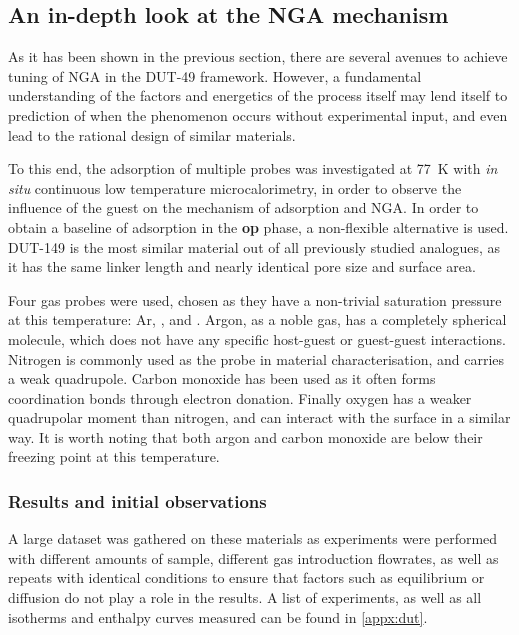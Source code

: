 
\subsection{An in-depth look at the NGA mechanism}%
\label{dut:indepth}

As it has been shown in the previous section, there are 
several avenues to achieve tuning of NGA in the DUT-49 framework.
However, a fundamental understanding of the factors and 
energetics of the process itself may
lend itself to prediction of when the phenomenon occurs without 
experimental input, and even lead to the rational design of 
similar materials.

To this end, the adsorption of multiple probes was investigated 
at \SI{77}{\kelvin} with \textit{in situ} continuous low 
temperature microcalorimetry,
in order to observe the influence of the guest on the mechanism of
adsorption and NGA. In order to obtain a baseline of adsorption in 
the \textbf{op} phase, a non-flexible alternative is used. 
DUT-149 is the most similar material out of all previously studied
analogues, as it has the same linker length and nearly identical pore
size and surface area. 

Four gas probes were used, chosen as they 
have a non-trivial saturation pressure at this temperature: Ar,
,  and . Argon, as a 
noble gas, has a completely spherical molecule, which does not 
have any specific host-guest or guest-guest interactions. Nitrogen
is commonly used as the probe in material characterisation, 
and carries a weak quadrupole. Carbon monoxide has been used 
as it often forms coordination bonds through electron donation.
Finally oxygen has a weaker quadrupolar moment than 
nitrogen, and can interact with the surface in a similar way.
It is worth noting that both argon and carbon monoxide are below 
their freezing point at this temperature.

\subsubsection{Results and initial observations}

A large dataset was gathered
on these materials as experiments were performed with different 
amounts of sample, different gas introduction flowrates, as well as repeats
with identical conditions to ensure that factors such as 
equilibrium or diffusion do not play a role in the results. A list 
of experiments, as well as all isotherms and enthalpy curves measured can
be found in \autoref{appx:dut}. 

